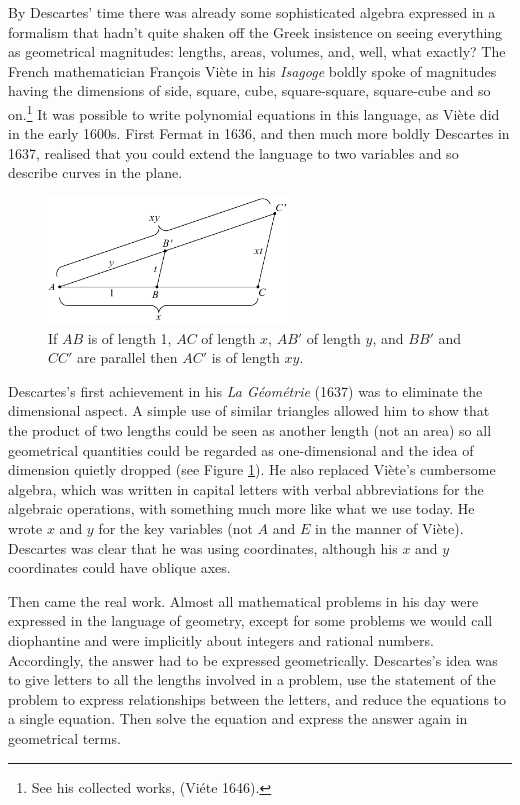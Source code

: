 By Descartes' time there was already some sophisticated algebra expressed in a formalism that hadn't quite shaken off   the Greek insistence on seeing everything as geometrical magnitudes: lengths, areas, volumes, and, well, what exactly? The French mathematician Fran\c{c}ois Vi\`ete in his \emph{Isagoge} boldly spoke of magnitudes having the dimensions of side, square, cube, square-square, square-cube and so on.\footnote{See his collected works, (Vi\'ete 1646).} It was possible to write polynomial equations in this language, as Vi\`ete did in the early 1600s. First Fermat in 1636, and then much more boldly Descartes in 1637, realised that you could extend the language to two variables and so describe curves in the plane.


\begin{figure}
  \includegraphics[width=180pt]{main/Multiplication} 
\caption{If $AB$ is of length 1, $AC$ of length $x$, $AB'$ of 
length $y$, and $BB'$ and $CC'$ are parallel then $AC'$ is of length $xy$.
}
      \label{figmultiplication}
\end{figure}

Descartes's first achievement in his \emph{La G\'eom\'etrie} (1637) was to eliminate the dimensional aspect. A simple use of similar triangles allowed him to show that the product of two lengths could be seen as another length (not an area) so all geometrical quantities could be regarded as one-dimensional and the idea of dimension quietly dropped (see Figure \ref{figmultiplication}). He also replaced Vi\`ete's cumbersome algebra, which was written in capital letters with verbal abbreviations for the algebraic operations, with something much more like   what we use today.  He wrote $x$ and $y$ for the key variables (not $A$ and $E$ in the manner of Vi\`ete). Descartes was clear that he was using coordinates, although his $x$ and $y$ coordinates could have oblique axes.


Then came the real work. Almost all mathematical problems in his day were expressed in the language of geometry, except for some problems we would call diophantine and were implicitly about integers and rational numbers. Accordingly, the answer had to be expressed geometrically. Descartes's idea was to give letters to all the lengths involved in a problem, use the statement of the problem to express relationships between the letters, and reduce the equations to a single equation. Then solve the equation and express the answer again in geometrical terms.  

